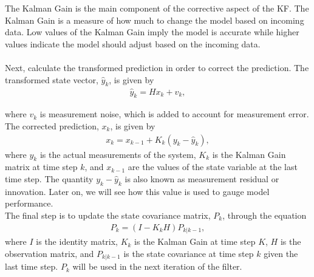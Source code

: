 \begin{enumerate}
     \noindent The Kalman Gain is the main component of the corrective aspect of the KF. The Kalman Gain is a measure of how much to change the model based on incoming data. Low values of the Kalman Gain imply the model is accurate while higher values indicate the model should adjust based on the incoming data.  \\ \\
   
     Next, calculate the transformed prediction in order to correct the prediction. The transformed state vector, $\hat y_k$, is given by
    \begin{align*}
        \hat y_k = H x_k + v_k,
    \end{align*}
    
    where $v_k$ is measurement noise, which is added to account for measurement error.
    The corrected prediction, $x_k$, is given by
    \begin{align*} 
        x_k = x_{k - 1} + K_k(y_k - \hat y_{k}),
    \end{align*}
   where  $y_k$ is the actual measurements of the system, $K_k$ is the Kalman Gain matrix at time step $k$, and $x_{k-1}$ are the values of the state variable at the last time step. The quantity $y_k - \hat y_{k}$ is also known as measurement residual or innovation.  Later on, we will see how this value is used to gauge model performance. \\
   
      The final step is to update the state covariance matrix, $P_k $, through the equation
    \begin{align*} 
        P_k = (I - K_k H) P_{k | k-1},
    \end{align*}
    where $I$ is the identity matrix, $K_k$ is the Kalman Gain at time step $K$, $H$ is the observation matrix, and $P_{k|k-1}$ is the state covariance at time step $k$ given the last time step. $ P_k $ will be used in the next iteration of the filter.
\end{enumerate} 


\newpage

